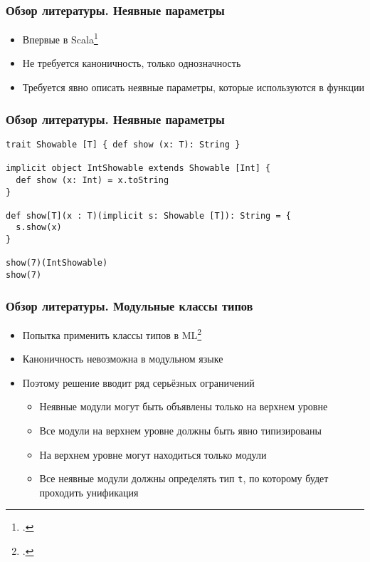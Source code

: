 \documentclass{beamer}
\begin{document}
\begin{frame}\frametitle{Обзор литературы. Неявные параметры}
\begin{itemize}
  \item Впервые в Scala\footcite{implicits}
  \item Не требуется каноничность, только однозначность
  \item Требуется явно описать неявные параметры, которые используются в функции
\end{itemize}
\end{frame}

\lstset{language=scala}
\begin{frame}[fragile]\frametitle{Обзор литературы. Неявные параметры}
\begin{lstlisting}
trait Showable [T] { def show (x: T): String }

implicit object IntShowable extends Showable [Int] {
  def show (x: Int) = x.toString
}

def show[T](x : T)(implicit s: Showable [T]): String = {
  s.show(x)
}

show(7)(IntShowable)
show(7)
\end{lstlisting}
\end{frame}

\begin{frame}\frametitle{Обзор литературы. Модульные классы типов}
\begin{itemize}
  \item Попытка применить классы типов в ML\footcite{ml_typeclasses}
  \item Каноничность невозможна в модульном языке
  \item Поэтому решение вводит ряд серьёзных ограничений
  \begin{itemize}
    \item Неявные модули могут быть объявлены только на верхнем уровне
    \item Все модули на верхнем уровне должны быть явно типизированы
    \item На верхнем уровне могут находиться только модули
    \item Все неявные модули должны определять тип \texttt{t}, по которому будет проходить унификация 
  \end{itemize}
\end{itemize}
\end{frame}
\end{document}
